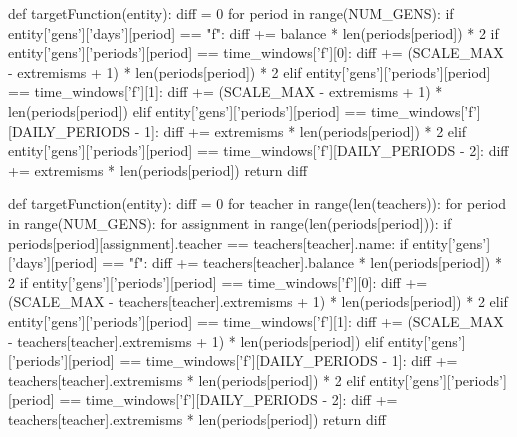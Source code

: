 \documentclass[12pt,a4paper]{report}
\begin{document}
\begin{python}
def targetFunction(entity):
    diff = 0
    for period in range(NUM_GENS):
        if entity['gens']['days'][period] == "f":
            diff += balance * len(periods[period]) * 2
        if entity['gens']['periods'][period] == time_windows['f'][0]:
            diff += (SCALE_MAX - extremisms + 1) * len(periods[period]) * 2
        elif entity['gens']['periods'][period] == time_windows['f'][1]:
            diff += (SCALE_MAX - extremisms + 1) * len(periods[period])
        elif entity['gens']['periods'][period] == time_windows['f'][DAILY_PERIODS - 1]:
            diff += extremisms * len(periods[period]) * 2
        elif entity['gens']['periods'][period] == time_windows['f'][DAILY_PERIODS - 2]:
            diff += extremisms * len(periods[period])
    return diff


def targetFunction(entity):
    diff = 0
    for teacher in range(len(teachers)):
        for period in range(NUM_GENS):
            for assignment in range(len(periods[period])):
                if periods[period][assignment].teacher == teachers[teacher].name:
                    if entity['gens']['days'][period] == "f":
                        diff += teachers[teacher].balance * len(periods[period]) * 2
                    if entity['gens']['periods'][period] == time_windows['f'][0]:
                        diff += (SCALE_MAX - teachers[teacher].extremisms + 1) * len(periods[period]) * 2
                    elif entity['gens']['periods'][period] == time_windows['f'][1]:
                        diff += (SCALE_MAX - teachers[teacher].extremisms + 1) * len(periods[period])
                    elif entity['gens']['periods'][period] == time_windows['f'][DAILY_PERIODS - 1]:
                        diff += teachers[teacher].extremisms * len(periods[period]) * 2
                    elif entity['gens']['periods'][period] == time_windows['f'][DAILY_PERIODS - 2]:
                        diff += teachers[teacher].extremisms * len(periods[period])
    return diff



\end{python}
\end{document}
